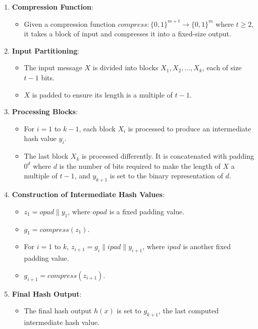 \documentclass[11pt]{article}
\begin{document}
\begin{enumerate}
    \item \textbf{Compression Function}: 
    \begin{itemize}
        \item Given a compression function \( \textit{compress} : \{0,1\}^{m+t} \rightarrow \{0,1\}^m \) where \( t \geq 2 \), it takes a block of input and compresses it into a fixed-size output.
    \end{itemize}
    
    \item \textbf{Input Partitioning}:
    \begin{itemize}
        \item The input message \( X \) is divided into blocks \( X_1, X_2, \ldots, X_k \), each of size \( t - 1 \) bits.
        \item \( X \) is padded to ensure its length is a multiple of \( t - 1 \).
    \end{itemize}
    
    \item \textbf{Processing Blocks}:
    \begin{itemize}
        \item For \( i = 1 \) to \( k - 1 \), each block \( X_i \) is processed to produce an intermediate hash value \( y_i \).
        \item The last block \( X_k \) is processed differently. It is concatenated with padding \( 0^d \) where \( d \) is the number of bits required to make the length of \( X \) a multiple of \( t - 1 \), and \( y_{k+1} \) is set to the binary representation of \( d \).
    \end{itemize}
    
    \item \textbf{Construction of Intermediate Hash Values}:
    \begin{itemize}
        \item \( z_1 = opad \mathbin\| y_1 \), where \( opad \) is a fixed padding value.
        \item \( g_1 = \textit{compress}(z_1) \).
        \item For \( i = 1 \) to \( k \), \( z_{i+1} = g_i \mathbin\| ipad \mathbin\| y_{i+1} \), where \( ipad \) is another fixed padding value.
        \item \( g_{i+1} = \textit{compress}(z_{i+1}) \).
    \end{itemize}
    
    \item \textbf{Final Hash Output}:
    \begin{itemize}
        \item The final hash output \( h(x) \) is set to \( g_{k+1} \), the last computed intermediate hash value.
    \end{itemize}
\end{enumerate}
\end{document}
